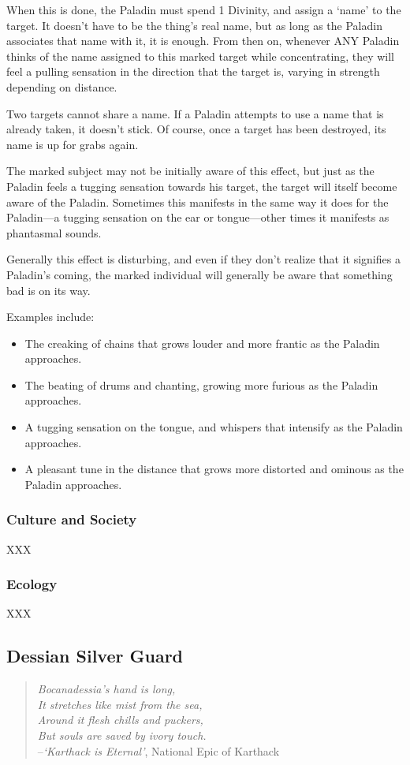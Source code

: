 \documentclass[oneside,11pt,english]{book}
\begin{document}
When this is done, the Paladin must spend 1 Divinity, and assign a ‘name’ to the
target. It doesn't have to be the thing's real name, but as long as the Paladin
associates that name with it, it is enough. From then on, whenever ANY Paladin
thinks of the name assigned to this marked target while concentrating, they will
feel a pulling sensation in the direction that the target is, varying in
strength depending on distance. 

Two targets cannot share a name. If a Paladin attempts to use a name that is
already taken, it doesn't stick. Of course, once a target has been destroyed,
its name is up for grabs again. 

The marked subject may not be initially aware of this effect, but just as the
Paladin feels a tugging sensation towards his target, the target will itself
become aware of the Paladin. 
Sometimes this manifests in the same way it does for the Paladin—a tugging sensation on the ear or tongue—other times it manifests as phantasmal sounds.

Generally this effect is disturbing, and even if they don't realize that it
signifies a Paladin's coming, the marked individual will generally be aware that
something bad is on its way.  


Examples include:
\begin{itemize}
\item The creaking of chains that grows louder and more frantic as the Paladin approaches. 
\item The beating of drums and chanting, growing more furious as the Paladin approaches. 
\item A tugging sensation on the tongue, and whispers that intensify as the Paladin approaches. 
\item A pleasant tune in the distance that grows more distorted and ominous as the Paladin 
  approaches. 
\end{itemize}
\subsubsection*{Culture and Society} 
XXX 
\subsubsection*{Ecology} 
XXX 
\subsection{Dessian Silver Guard}\label{sec:dessian-silver-guard}
\begin{verse}
  \emph{Bocanadessia's hand is long,\\
    It stretches like mist from the sea,\\
    Around it flesh chills and puckers,\\
    But souls are saved by ivory touch.}\\

  --\textit{‘Karthack is Eternal’}, National Epic of Karthack
\end{verse}
\end{document}
